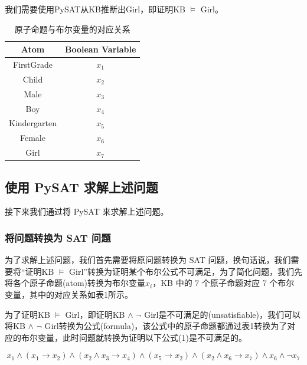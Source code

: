 \documentclass{article}
\begin{document}
我们需要使用PySAT从KB推断出Girl，即证明KB $\models$ Girl。

\begin{table}[!htbp]
    \centering
    
    \begin{tabular}{|c|c|}
        \hline
        \rowcolor{gray!30} \textbf{Atom} & \textbf{Boolean Variable} \\
        \hline
        FirstGrade & $x_1$\\
        \hline
        Child & $x_2$\\
        \hline
        Male & $x_3$\\
        \hline
        Boy & $x_4$\\
        \hline
        Kindergarten & $x_5$\\
        \hline
        Female & $x_6$\\
        \hline
        Girl & $x_7$\\
        \hline
    \end{tabular}
    \caption{原子命题与布尔变量的对应关系}
    \label{tab:my_label}
\end{table}

\subsection{使用 PySAT 求解上述问题}

接下来我们通过将 PySAT 来求解上述问题。

\subsubsection{将问题转换为 SAT 问题}

为了求解上述问题，我们首先需要将原问题转换为 SAT 问题，换句话说，我们需要将“证明KB $\models$ Girl”转换为证明某个布尔公式不可满足，为了简化问题，我们先将各个原子命题(atom)转换为布尔变量$x_i$，KB 中的 7 个原子命题对应 7 个布尔变量，其中的对应关系如表1所示。

为了证明KB $\models$ Girl，即证明KB $\wedge$ $\neg$ Girl是不可满足的(unsatisfiable)，我们可以将KB $\wedge$ $\neg$ Girl转换为公式(formula)，该公式中的原子命题都通过表1转换为了对应的布尔变量，此时问题就转换为证明以下公式(1)是不可满足的。

\begin{equation}
    x_1 \wedge (x_1 \to x_2) \wedge (x_2 \wedge x_3 \to x_4) \wedge (x_5 \to x_2) \wedge (x_2 \wedge x_6 \to x_7) \wedge x_6 \wedge \neg x_7
\end{equation}
\end{document}
